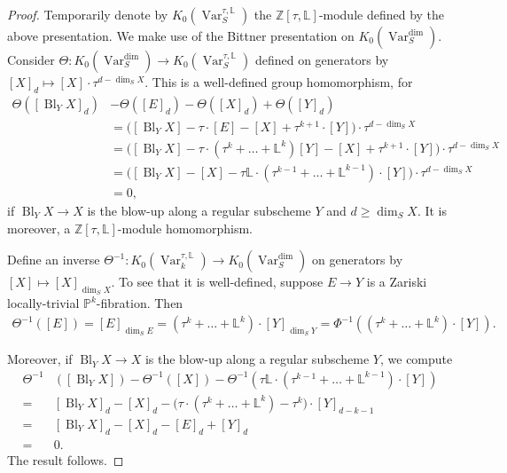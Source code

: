 \documentclass{amsart}
\theoremstyle{definition}
\DeclareMathOperator{\Var}{Var}
\DeclareMathOperator{\Bl}{Bl}
\newcommand{\KdimS}{K_0(\Var_S^{\dim})}
\numberwithin{equation}{section}
\begin{document}
\begin{proof}
Temporarily denote by $K_0(\Var_S^{\tau, \mathbb{L}})$ the $\mathbb{Z}[\tau, \mathbb{L}]$-module defined by the above presentation. We make use of the Bittner presentation on $\KdimS$. Consider $\Theta: \KdimS \rightarrow K_0(\Var_S^{\tau, \mathbb{L}})$ defined on generators by $[X]_d \mapsto [X] \cdot \tau^{d - \dim_S X}$. This is a well-defined group homomorphism, for
\begin{align*}
    \Theta([\Bl_Y X]_d) &- \Theta([E]_d) - \Theta([X]_d) + \Theta([Y]_d) \\
    &= \big( [\Bl_Y X] - \tau \cdot [E] -[X] + \tau^{k+1} \cdot [Y]  \big) \cdot \tau^{d-\dim_S X} \\
    &= \big( [\Bl_Y X] - \tau \cdot (\tau^{k}+ \ldots + \mathbb{L}^{k})[Y] -[X] + \tau^{k+1} \cdot [Y]  \big) \cdot \tau^{d-\dim_S X} \\
    &= \big( [\Bl_Y X] -[X] - \tau \mathbb{L} \cdot ( \tau^{k-1} + \ldots + \mathbb{L}^{k-1}) \cdot [Y]  \big) \cdot \tau^{d-\dim_S X} \\
    &= 0,
\end{align*}
if $\Bl_Y X \rightarrow X$ is the blow-up along a regular subscheme $Y$ and $d \geq \dim_S X$. It is moreover, a $\mathbb{Z}[\tau, \mathbb{L}]$-module homomorphism.

Define an inverse $\Theta^{-1}:  K_0(\Var_k^{\tau, \mathbb{L}}) \rightarrow \KdimS$ on generators by $[X] \mapsto [X]_{\dim_S X}$. To see that it is well-defined, suppose $E \rightarrow Y$ is a Zariski locally-trivial $\mathbb{P}^k$-fibration. Then
\begin{align*}
    \Theta^{-1}([E]) = [E]_{\dim_S E} = (\tau^k + \ldots + \mathbb{L}^k) \cdot 
 [Y]_{\dim_S Y} = \Phi^{-1}((\tau^k + \ldots + \mathbb{L}^k) \cdot [Y]).
\end{align*}

Moreover, if $\Bl_Y X \rightarrow X$ is the blow-up along a regular subscheme $Y$, we compute
\begin{align*}
    \Theta^{-1}&([\Bl_Y X]) - \Theta^{-1}([X]) - \Theta^{-1}(\tau \mathbb{L} \cdot (\tau^{k-1} + \ldots + \mathbb{L}^{k-1}) \cdot [Y]) \\
    =& [\Bl_Y X]_d - [X]_d - \big( \tau \cdot (\tau^k + \ldots + \mathbb{L}^k) - \tau^k \big) \cdot [Y]_{d-k-1} \\
    =& [\Bl_Y X]_d - [X]_d - [E]_{d} + [Y]_{d} \\
    =& 0.
\end{align*}
The result follows.
\end{proof}
\end{document}
